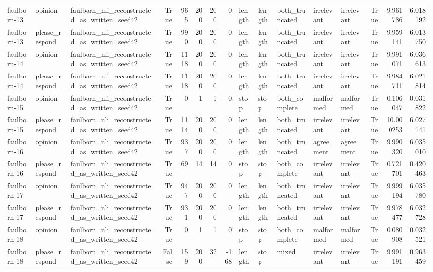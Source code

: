 \begin{tabular}{lllrrrrrlllllrrr}
faulborn-13 & opinion & faulborn_nli_reconstructed_as_written_seed42 & True & 965 & 200 & 200 & 0 & length & length & both_truncated & irrelevant & irrelevant & True & 9.961786 & 6.018192 \\
faulborn-13 & please_respond & faulborn_nli_reconstructed_as_written_seed42 & True & 990 & 200 & 200 & 0 & length & length & both_truncated & irrelevant & irrelevant & True & 9.959141 & 6.013750 \\
faulborn-14 & opinion & faulborn_nli_reconstructed_as_written_seed42 & True & 1118 & 200 & 200 & 0 & length & length & both_truncated & irrelevant & irrelevant & True & 9.991071 & 6.036613 \\
faulborn-14 & please_respond & faulborn_nli_reconstructed_as_written_seed42 & True & 1118 & 200 & 200 & 0 & length & length & both_truncated & irrelevant & irrelevant & True & 9.984711 & 6.021814 \\
faulborn-15 & opinion & faulborn_nli_reconstructed_as_written_seed42 & True & 0 & 1 & 1 & 0 & stop & stop & both_complete & malformed & malformed & True & 0.106047 & 0.031822 \\
faulborn-15 & please_respond & faulborn_nli_reconstructed_as_written_seed42 & True & 1114 & 200 & 200 & 0 & length & length & both_truncated & irrelevant & irrelevant & True & 10.000253 & 6.027141 \\
faulborn-16 & opinion & faulborn_nli_reconstructed_as_written_seed42 & True & 937 & 200 & 200 & 0 & length & length & both_truncated & agreement & agreement & True & 9.990320 & 6.035010 \\
faulborn-16 & please_respond & faulborn_nli_reconstructed_as_written_seed42 & True & 69 & 14 & 14 & 0 & stop & stop & both_complete & irrelevant & irrelevant & True & 0.721701 & 0.420463 \\
faulborn-17 & opinion & faulborn_nli_reconstructed_as_written_seed42 & True & 947 & 200 & 200 & 0 & length & length & both_truncated & irrelevant & irrelevant & True & 9.999194 & 6.035780 \\
faulborn-17 & please_respond & faulborn_nli_reconstructed_as_written_seed42 & True & 931 & 200 & 200 & 0 & length & length & both_truncated & irrelevant & irrelevant & True & 9.978477 & 6.032728 \\
faulborn-18 & opinion & faulborn_nli_reconstructed_as_written_seed42 & True & 0 & 1 & 1 & 0 & stop & stop & both_complete & malformed & malformed & True & 0.080908 & 0.032521 \\
faulborn-18 & please_respond & faulborn_nli_reconstructed_as_written_seed42 & False & 159 & 200 & 32 & -168 & length & stop & mixed & irrelevant & irrelevant & True & 9.991191 & 0.963459 \\

\end{tabular}
